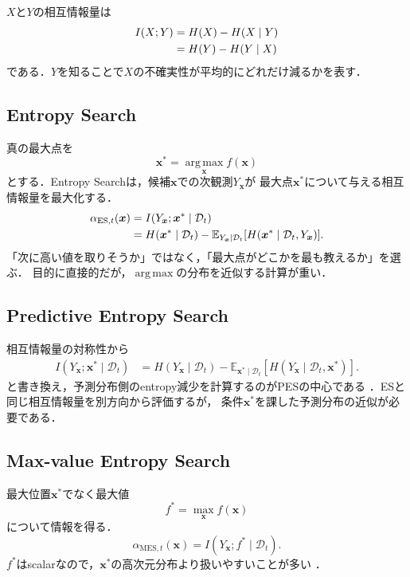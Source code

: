\documentclass[a4paper,11pt]{ltjsarticle}
\newcommand{\E}{\mathbb E}
\newcommand{\D}{\mathcal D}
\newcommand{\argmax}{\operatorname*{arg\,max}}
\begin{document}
\(X\)と\(Y\)の相互情報量は
\begin{align}
  I(X;Y)
  &=H(X)-H(X\mid Y)\notag\\
  &=H(Y)-H(Y\mid X)
  \label{eq:mutual-information}
\end{align}
である．\(Y\)を知ることで\(X\)の不確実性が平均的にどれだけ減るかを表す．

\subsection{Entropy Search}

真の最大点を
\begin{equation}
  \bm x^*=\argmax_{\bm x}f(\bm x)
\end{equation}
とする．Entropy Searchは，候補\(\bm x\)での次観測\(Y_{\bm x}\)が
最大点\(\bm x^*\)について与える相互情報量を最大化する\citep{hennig2012entropy}．
\begin{align}
  \alpha_{\mathrm{ES},t}(\bm x)
  &=I(Y_{\bm x};\bm x^*\mid\D_t)\notag\\
  &=H(\bm x^*\mid\D_t)
  -\E_{Y_{\bm x}\mid\D_t}
  [H(\bm x^*\mid\D_t,Y_{\bm x})].
  \label{eq:entropy-search}
\end{align}
「次に高い値を取りそうか」ではなく，「最大点がどこかを最も教えるか」を選ぶ．
目的に直接的だが，\(\argmax\)の分布を近似する計算が重い．

\subsection{Predictive Entropy Search}

相互情報量の対称性から
\begin{align}
  I(Y_{\bm x};\bm x^*\mid\D_t)
  &=H(Y_{\bm x}\mid\D_t)
  -\E_{\bm x^*\mid\D_t}
  [H(Y_{\bm x}\mid\D_t,\bm x^*)].
  \label{eq:predictive-entropy-search}
\end{align}
と書き換え，予測分布側のentropy減少を計算するのがPESの中心である
\citep{hernandezlobato2014pes}．ESと同じ相互情報量を別方向から評価するが，
条件\(\bm x^*\)を課した予測分布の近似が必要である．

\subsection{Max-value Entropy Search}

最大位置\(\bm x^*\)でなく最大値
\begin{equation}
  f^*=\max_{\bm x}f(\bm x)
\end{equation}
について情報を得る．
\begin{equation}
  \alpha_{\mathrm{MES},t}(\bm x)
  =I(Y_{\bm x};f^*\mid\D_t).
  \label{eq:mes}
\end{equation}
\(f^*\)はscalarなので，\(\bm x^*\)の高次元分布より扱いやすいことが多い
\citep{wang2017mes}．
\end{document}
